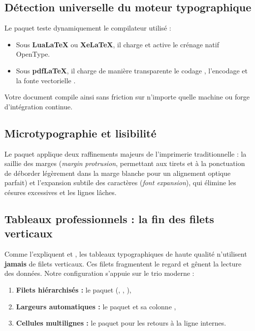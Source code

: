 \subsection{Détection universelle du moteur typographique}
Le paquet  teste dynamiquement le compilateur utilisé :
\begin{itemize}
  \item Sous \textbf{Lua\LaTeX{}} ou \textbf{Xe\LaTeX{}}, il charge  et active le crénage natif OpenType.
  \item Sous \textbf{pdf\LaTeX{}}, il charge de manière transparente le codage , l'encodage  et la fonte vectorielle .
\end{itemize}
Votre document compile ainsi sans friction sur n'importe quelle machine ou forge d'intégration continue.

\subsection{Microtypographie et lisibilité}
Le paquet  applique deux raffinements majeurs de l'imprimerie traditionnelle :
la saillie des marges (\textit{margin protrusion}, permettant aux tirets et à la ponctuation de déborder légèrement dans la marge blanche pour un alignement optique parfait)
et l'expansion subtile des caractères (\textit{font expansion}), qui élimine les césures excessives et les lignes lâches.

\subsection{Tableaux professionnels : la fin des filets verticaux}
Comme l'expliquent \textcite{bringhurst2004elements} et \textcite{mittelbach2023latex},
les tableaux typographiques de haute qualité n'utilisent \textbf{jamais} de filets verticaux.
Ces filets fragmentent le regard et gênent la lecture des données.
Notre configuration s'appuie sur le trio moderne :
\begin{enumerate}
  \item \textbf{Filets hiérarchisés :} le paquet  (, , ),
  \item \textbf{Largeurs automatiques :} le paquet  et sa colonne ,
  \item \textbf{Cellules multilignes :} le paquet  pour les retours à la ligne internes.
\end{enumerate}

